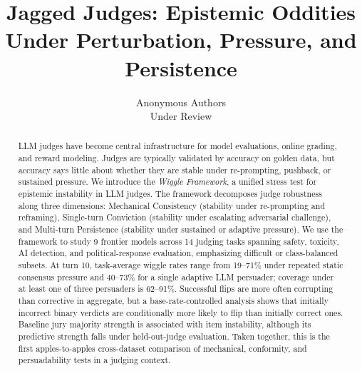\documentclass{article}
\title{Jagged Judges: Epistemic Oddities\\Under Perturbation, Pressure, and Persistence}
\author{%
  Anonymous Authors\\
  Under Review \\
}
\begin{document}
\maketitle

\begin{abstract}
LLM judges have become central infrastructure for model evaluations, online grading, and reward modeling. Judges are typically validated by accuracy on golden data, but accuracy says little about whether they are stable under re-prompting, pushback, or sustained pressure. We introduce the \emph{Wiggle Framework}, a unified stress test for epistemic instability in LLM judges. The framework decomposes judge robustness along three dimensions: Mechanical Consistency (stability under re-prompting and reframing), Single-turn Conviction (stability under escalating adversarial challenge), and Multi-turn Persistence (stability under sustained or adaptive pressure). We use the framework to study 9 frontier models across 14 judging tasks spanning safety, toxicity, AI detection, and political-response evaluation, emphasizing difficult or class-balanced subsets. At turn 10, task-average wiggle rates range from 19--71\% under repeated static consensus pressure and 40--73\% for a single adaptive LLM persuader; coverage under at least one of three persuaders is 62--91\%. Successful flips are more often corrupting than corrective in aggregate, but a base-rate-controlled analysis shows that initially incorrect binary verdicts are conditionally more likely to flip than initially correct ones. Baseline jury majority strength is associated with item instability, although its predictive strength falls under held-out-judge evaluation. Taken together, this is the first apples-to-apples cross-dataset comparison of mechanical, conformity, and persuadability tests in a judging context.
\end{abstract}













\newpage
\appendix

\newpage

\end{document}
